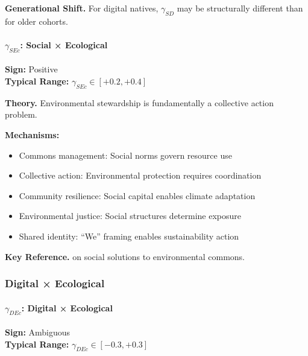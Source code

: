 \textbf{Generational Shift.}
For digital natives, $\gamma_{SD}$ may be structurally different than for 
older cohorts.


\paragraph{$\gamma_{SEc}$: Social × Ecological}

\begin{tcolorbox}[colback=green!5, colframe=green!50!black]
\textbf{Sign:} Positive \\
\textbf{Typical Range:} $\gamma_{SEc} \in [+0.2, +0.4]$
\end{tcolorbox}

\textbf{Theory.}
Environmental stewardship is fundamentally a collective action problem.

\textbf{Mechanisms:}
\begin{itemize}
    \item Commons management: Social norms govern resource use
    \item Collective action: Environmental protection requires coordination
    \item Community resilience: Social capital enables climate adaptation
    \item Environmental justice: Social structures determine exposure
    \item Shared identity: ``We'' framing enables sustainability action
\end{itemize}

\textbf{Key Reference.}
\citet{ostrom1990governing} on social solutions to environmental commons.


\subsubsection{Digital × Ecological}

\paragraph{$\gamma_{DEc}$: Digital × Ecological}

\begin{tcolorbox}[colback=yellow!5, colframe=yellow!50!black]
\textbf{Sign:} Ambiguous \\
\textbf{Typical Range:} $\gamma_{DEc} \in [-0.3, +0.3]$
\end{tcolorbox}

